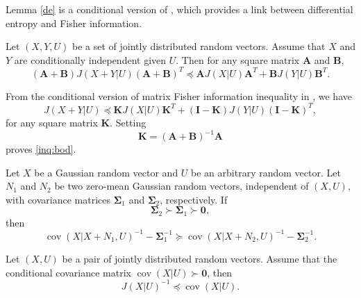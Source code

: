 \documentclass[journal,final, onecolumn]{IEEEtran}
\DeclareMathOperator{\cov}{cov}
\begin{document}
Lemma \ref{de} is a conditional version of \cite[Theorem 1]{PV06}, which provides a link between differential entropy and Fisher information.
\smallskip
\begin{lemma} \label{fi_inq}
Let $({X}, {Y},U)$ be a set of jointly distributed random vectors. Assume that ${X}$ and ${Y}$ are
conditionally independent given $U$.  Then for any square matrix $\boldsymbol{A}$ and $\boldsymbol{B}$,
\begin{equation}
(\boldsymbol{A}+ \boldsymbol{B})J({X}+ {Y} | U)(\boldsymbol{A}+ \boldsymbol{B})^{T} \preceq \boldsymbol{A} J({X} | U)\boldsymbol{A}^{T} + \boldsymbol{B} J({Y} | U)\boldsymbol{B}^{T}. \label{inq:bod}
\end{equation}
\end{lemma}
\begin{IEEEproof}
From the conditional version of matrix Fisher information inequality in \cite[Appendix II]{LV07}, we have
\begin{equation}
J(X+Y|U) \preceq \boldsymbol{K}J(X|U)\boldsymbol{K}^{T} + (\boldsymbol{I} - \boldsymbol{K})J(Y|U)(\boldsymbol{I} - \boldsymbol{K})^{T},
\end{equation}
for any square matrix $\boldsymbol{K}$. Setting
\begin{equation}
\boldsymbol{K} = (\boldsymbol{A}+ \boldsymbol{B})^{-1}\boldsymbol{A}
\end{equation}
proves  \eqref{inq:bod}.
\end{IEEEproof}
\smallskip
\begin{lemma} \label{MMSE_inq}
Let $X$ be a Gaussian random vector and $U$ be an arbitrary random vector. Let $N_{1}$ and $N_{2}$ be two zero-mean Gaussian random vectors, independent of $(X,U)$, with covariance matrices $\boldsymbol{\Sigma}_{1}$ and $\boldsymbol{\Sigma}_{2}$, respectively. If
\begin{equation}
\boldsymbol{\Sigma}_{2} \succ \boldsymbol{\Sigma}_{1} \succ \boldsymbol{0},
\end{equation}
then
\begin{equation}
\cov \left( X \big| X+N_{1},U\right)^{-1} - \boldsymbol{\Sigma}_{1}^{-1} \succeq \cov \left( X \big| X+N_{2},U\right)^{-1} - \boldsymbol{\Sigma}_{2}^{-1}.
\end{equation}
\end{lemma}
\smallskip


\begin{lemma}  \label{cri}
Let $({X}, U)$ be a pair of jointly distributed random vectors. Assume that the conditional covariance matrix $ \cov (X| U) \succ \mathbf{0}$, then
$$
J({X}| U)^{-1} \preceq \cov ({X}| U).
$$
\end{lemma}
\end{document}
